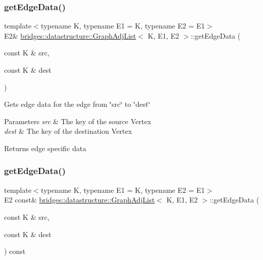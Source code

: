 \subsubsection{\texorpdfstring{get\+Edge\+Data()}{getEdgeData()}\hspace{0.1cm}{\footnotesize\ttfamily [1/2]}}
{\footnotesize\ttfamily template$<$typename K, typename E1 = K, typename E2 = E1$>$ \\
E2\& \mbox{\hyperlink{classbridges_1_1datastructure_1_1_graph_adj_list}{bridges\+::datastructure\+::\+Graph\+Adj\+List}}$<$ K, E1, E2 $>$\+::get\+Edge\+Data (\begin{DoxyParamCaption}\item[{const K \&}]{src,  }\item[{const K \&}]{dest }\end{DoxyParamCaption})\hspace{0.3cm}{\ttfamily [inline]}}

Gets edge data for the edge from \char`\"{}src\char`\"{} to \char`\"{}dest\char`\"{}


\begin{DoxyParams}{Parameters}
{\em src} & The key of the source Vertex \\
\hline
{\em dest} & The key of the destination Vertex\\
\hline
\end{DoxyParams}
\begin{DoxyReturn}{Returns}
edge specific data 
\end{DoxyReturn}
\mbox{\label{classbridges_1_1datastructure_1_1_graph_adj_list_a5c2cdffda7c983c3141ae36acc2b698d}} 
\subsubsection{\texorpdfstring{get\+Edge\+Data()}{getEdgeData()}\hspace{0.1cm}{\footnotesize\ttfamily [2/2]}}
{\footnotesize\ttfamily template$<$typename K, typename E1 = K, typename E2 = E1$>$ \\
E2 const\& \mbox{\hyperlink{classbridges_1_1datastructure_1_1_graph_adj_list}{bridges\+::datastructure\+::\+Graph\+Adj\+List}}$<$ K, E1, E2 $>$\+::get\+Edge\+Data (\begin{DoxyParamCaption}\item[{const K \&}]{src,  }\item[{const K \&}]{dest }\end{DoxyParamCaption}) const\hspace{0.3cm}{\ttfamily [inline]}}

